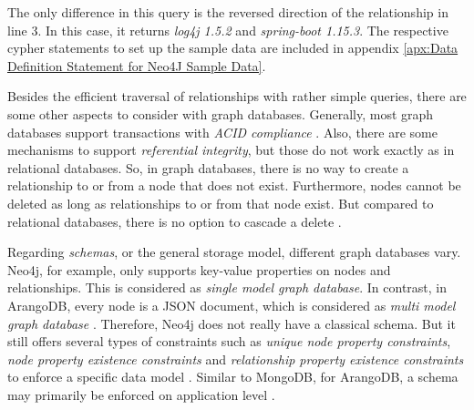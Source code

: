 The only difference in this query is the reversed direction of the relationship in line 3. In this case, it returns \emph{log4j 1.5.2} and \emph{spring-boot 1.15.3}. The respective cypher statements to set up the sample data are included in appendix \ref{apx:Data Definition Statement for Neo4J Sample Data}.\par
Besides the efficient traversal of relationships with rather simple queries, there are some other aspects to consider with graph databases. Generally, most graph databases support transactions with \emph{ACID compliance} \cite{neo4jtransactions, arangodbtransactions}. Also, there are some mechanisms to support \emph{referential integrity}, but those do not work exactly as in relational databases. So, in graph databases, there is no way to create a relationship to or from a node that does not exist. Furthermore, nodes cannot be deleted as long as relationships to or from that node exist. But compared to relational databases, there is no option to cascade a delete \cite{neo4jdelete}.\par
Regarding \emph{schemas}, or the general storage model, different graph databases vary. Neo4j, for example, only supports key-value properties on nodes and relationships. This is considered as \emph{single model graph database}. In contrast, in ArangoDB, every node is a JSON document, which is considered as \emph{multi model graph database} \cite{arangodbdocuments}. Therefore, Neo4j does not really have a classical schema. But it still offers several types of constraints such as \emph{unique node property constraints}, \emph{node property existence constraints} and \emph{relationship property existence constraints} to enforce a specific data model \cite{neo4jconstraints}. Similar to MongoDB, for ArangoDB, a schema may primarily be enforced on application level \cite{arangodbschema}.

